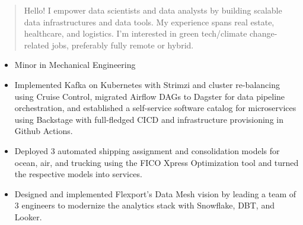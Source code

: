 \documentclass[10pt,a4paper,ragged2e,withhyper]{altacv}
\begin{document}
\begin{paracol}{2}



  \newpage

  \switchcolumn

  \begin{quote}
    Hello! I empower data scientists and data analysts by building scalable data infrastructures and data tools. My experience spans real estate, healthcare, and logistics. I’m interested in green tech/climate change-related jobs, preferably fully remote or hybrid.
  \end{quote}
  \begin{itemize}
    \item Minor in Mechanical Engineering
  \end{itemize}
  \begin{itemize}
    \item Implemented Kafka on Kubernetes with Strimzi and cluster re-balancing using Cruise Control, migrated Airflow DAGs to Dagster for data pipeline orchestration, and established a self-service software catalog for microservices using Backstage with full-fledged CICD and infrastructure provisioning in Github Actions.
    \item Deployed 3 automated shipping assignment and consolidation models for ocean, air, and trucking using the FICO Xpress Optimization tool and turned the respective models into services.
    \item Designed and implemented Flexport's Data Mesh vision by leading a team of 3 engineers to modernize the analytics stack with Snowflake, DBT, and Looker.
  \end{itemize}
  \divider


\end{paracol}
\end{document}
